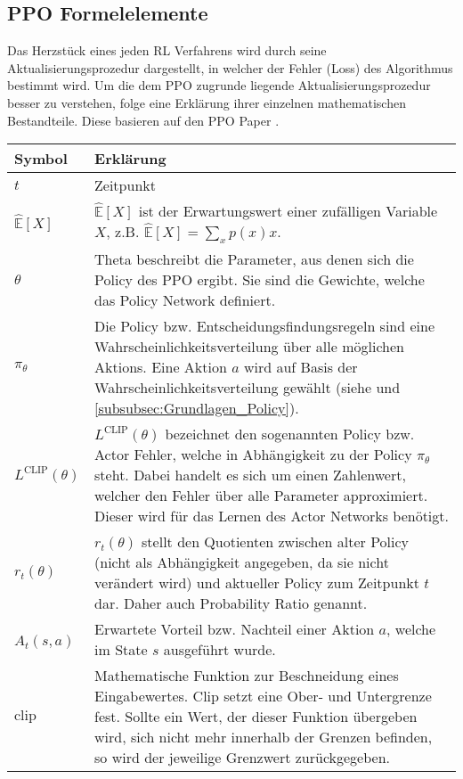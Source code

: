 \subsection{PPO Formelelemente}
Das Herzstück eines jeden RL Verfahrens wird durch seine Aktualisierungsprozedur dargestellt, in welcher der Fehler (Loss) des Algorithmus bestimmt wird. Um die dem PPO zugrunde liegende Aktualisierungsprozedur besser zu verstehen, folge eine Erklärung ihrer einzelnen mathematischen Bestandteile. 
Diese basieren auf den PPO Paper \citep{PPO}.
\begin{longtable}[h]{|p{1.5cm}|p{\linewidth - 2.5cm}|}
	\hline
	Symbol & Erklärung \\
	\hline
	$t$ & Zeitpunkt \\
	\hline
	$\mathbb{\hat{E}}[X]$ & $\mathbb{\hat{E}}[X]$ ist der Erwartungswert einer zufälligen Variable $X$, z.B. $\mathbb{\hat{E}}[X] = \sum_{x}p(x)x$. \citep[Summary of Notation S. xv]{Sutton1998} \\
	\hline
	$\theta$ & Theta beschreibt die Parameter, aus denen sich die Policy des PPO ergibt. Sie sind die Gewichte, welche das Policy Network definiert. \\
	\hline
	$\pi_{\theta}$ & Die Policy bzw. Entscheidungsfindungsregeln sind eine Wahrscheinlichkeitsverteilung über alle möglichen Aktions. Eine Aktion $a$ wird auf Basis der Wahrscheinlichkeitsverteilung gewählt (siehe \citep[Summary of Notation S. xvi]{Sutton1998} und \autoref{subsubsec:Grundlagen_Policy}). \\
	\hline
	$L^\text{CLIP} (\theta)$ & $L^\text{CLIP} (\theta)$ bezeichnet den sogenannten Policy bzw. Actor Fehler, welche in Abhängigkeit zu der Policy $\pi_{\theta}$ steht. Dabei handelt es sich um einen Zahlenwert, welcher den Fehler über alle Parameter approximiert. Dieser wird für das Lernen des Actor Networks benötigt. \\
	\hline
	$r_{t}(\theta)$ & $r_{t}(\theta)$ stellt den Quotienten zwischen alter Policy (nicht als Abhängigkeit angegeben, da sie nicht verändert wird) und aktueller Policy zum Zeitpunkt $t$ dar. Daher auch Probability Ratio genannt. \\
	\hline
	$\hat{A}_{t}(s, a)$ & Erwartete Vorteil bzw. Nachteil einer Aktion $a$, welche im State $s$ ausgeführt wurde. \\
	\hline
	$\text{clip}$ & Mathematische Funktion zur Beschneidung eines Eingabewertes. Clip setzt eine Ober- und Untergrenze fest. Sollte ein Wert, der dieser Funktion übergeben wird, sich nicht mehr innerhalb der Grenzen befinden, so wird der jeweilige Grenzwert zurückgegeben. \\

\end{longtable}
